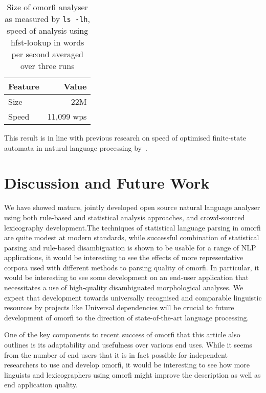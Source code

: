 \documentclass[a4paper,12pt]{article}
\begin{document}
\begin{table}
    \begin{scriptsize}
        \centering
        \begin{tabular}{|l|r|}
            \hline
            \bf Feature & \bf Value \\
            \hline
            Size & 22M \\
            Speed & 11,099 wps\\
            \hline
        \end{tabular}
        \caption{Size of omorfi analyser as measured by \texttt{ls -lh}, speed
        of analysis using hfst-lookup in words per second \label{table:size-speed} averaged over three runs}
    \end{scriptsize}
\end{table}

This result is in line with previous research on speed of optimised finite-state
automata in natural language processing by~\citet{silfverberg2009hfst}.

\section{Discussion and Future Work}
\label{sec:discussion}

We have showed mature, jointly developed open source
natural language analyser using both rule-based and
statistical analysis approaches, and crowd-sourced
lexicography development.The techniques of
statistical language parsing in omorfi are quite
modest at modern standards, while successful
combination of statistical parsing and rule-based
disambiguation is shown to be usable for a range of
NLP applications, it would be interesting to see the
effects of more representative corpora used with
different methods to parsing quality of omorfi.  In
particular, it would be interesting to see some
development on an end-user application that
necessitates a use of high-quality disambiguated
morphological analyses.  We expect that development
towards universally recognised and comparable
linguistic resources by projects like Universal dependencies
will be crucial to future development of omorfi to
the direction of state-of-the-art language
processing.

One of the key components to recent success of
omorfi that this article also outlines is its
adaptability and usefulness over various end uses.
While it seems from the number of end users that it
is in fact possible for independent researchers to
use and develop omorfi, it would be interesting to
see how more linguists and lexicographers using
omorfi might improve the description as well as end
application quality.
\end{document}
